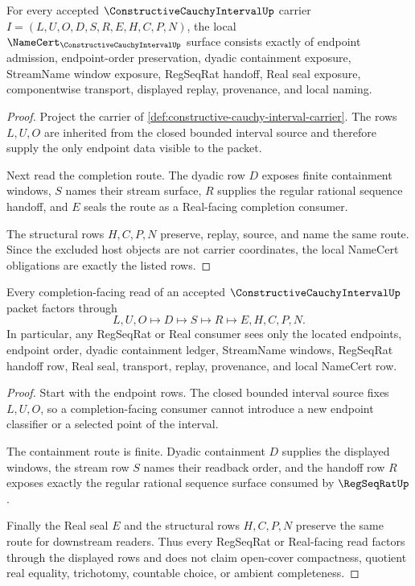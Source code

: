 \begin{theorem}
\label{thm:constructive-cauchy-interval-namecert-obligations}
For every accepted $\ConstructiveCauchyIntervalUp$ carrier $I=(L,U,O,D,S,R,E,H,C,P,N)$, the local $\NameCert_{\ConstructiveCauchyIntervalUp}$ surface consists exactly of endpoint admission, endpoint-order preservation, dyadic containment exposure, StreamName window exposure, RegSeqRat handoff, Real seal exposure, componentwise transport, displayed replay, provenance, and local naming.
\end{theorem}
\begin{proof}
Project the carrier of \autoref{def:constructive-cauchy-interval-carrier}. The rows $L,U,O$ are inherited from the closed bounded interval source and therefore supply the only endpoint data visible to the packet.

Next read the completion route. The dyadic row $D$ exposes finite containment windows, $S$ names their stream surface, $R$ supplies the regular rational sequence handoff, and $E$ seals the route as a Real-facing completion consumer.

The structural rows $H,C,P,N$ preserve, replay, source, and name the same route. Since the excluded host objects are not carrier coordinates, the local NameCert obligations are exactly the listed rows.
\end{proof}

\begin{theorem}
\label{thm:constructive-cauchy-interval-regseqrat-handoff}
Every completion-facing read of an accepted $\ConstructiveCauchyIntervalUp$ packet factors through
$$
L,U,O \longmapsto D \longmapsto S \longmapsto R \longmapsto E,H,C,P,N.
$$
In particular, any RegSeqRat or Real consumer sees only the located endpoints, endpoint order, dyadic containment ledger, StreamName windows, RegSeqRat handoff row, Real seal, transport, replay, provenance, and local NameCert row.
\end{theorem}
\begin{proof}
Start with the endpoint rows. The closed bounded interval source fixes $L,U,O$, so a completion-facing consumer cannot introduce a new endpoint classifier or a selected point of the interval.

The containment route is finite. Dyadic containment $D$ supplies the displayed windows, the stream row $S$ names their readback order, and the handoff row $R$ exposes exactly the regular rational sequence surface consumed by $\RegSeqRatUp$.

Finally the Real seal $E$ and the structural rows $H,C,P,N$ preserve the same route for downstream readers. Thus every RegSeqRat or Real-facing read factors through the displayed rows and does not claim open-cover compactness, quotient real equality, trichotomy, countable choice, or ambient completeness.
\end{proof}

